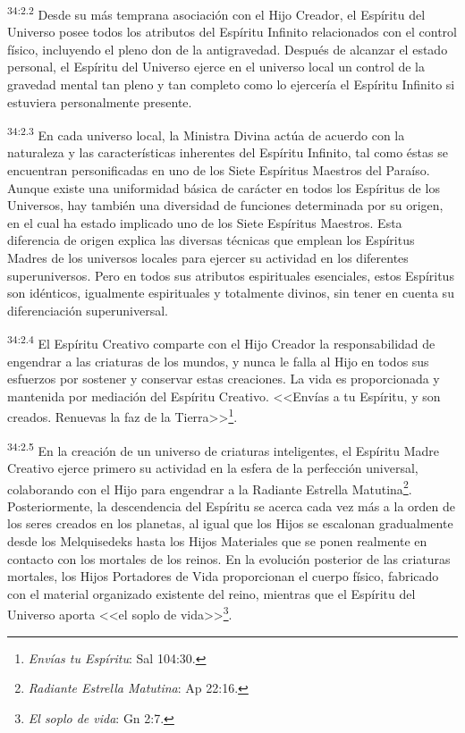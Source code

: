 \par
\textsuperscript{34:2.2} Desde su más temprana asociación con el Hijo Creador, el Espíritu del Universo posee todos los atributos del Espíritu Infinito relacionados con el control físico, incluyendo el pleno don de la antigravedad. Después de alcanzar el estado personal, el Espíritu del Universo ejerce en el universo local un control de la gravedad mental tan pleno y tan completo como lo ejercería el Espíritu Infinito si estuviera personalmente presente.

\par
\textsuperscript{34:2.3} En cada universo local, la Ministra Divina actúa de acuerdo con la naturaleza y las características inherentes del Espíritu Infinito, tal como éstas se encuentran personificadas en uno de los Siete Espíritus Maestros del Paraíso. Aunque existe una uniformidad básica de carácter en todos los Espíritus de los Universos, hay también una diversidad de funciones determinada por su origen, en el cual ha estado implicado uno de los Siete Espíritus Maestros. Esta diferencia de origen explica las diversas técnicas que emplean los Espíritus Madres de los universos locales para ejercer su actividad en los diferentes superuniversos. Pero en todos sus atributos espirituales esenciales, estos Espíritus son idénticos, igualmente espirituales y totalmente divinos, sin tener en cuenta su diferenciación superuniversal.

\par
\textsuperscript{34:2.4} El Espíritu Creativo comparte con el Hijo Creador la responsabilidad de engendrar a las criaturas de los mundos, y nunca le falla al Hijo en todos sus esfuerzos por sostener y conservar estas creaciones. La vida es proporcionada y mantenida por mediación del Espíritu Creativo. <<Envías a tu Espíritu, y son creados. Renuevas la faz de la Tierra>>\footnote{\textit{Envías tu Espíritu}: Sal 104:30.}.

\par
\textsuperscript{34:2.5} En la creación de un universo de criaturas inteligentes, el Espíritu Madre Creativo ejerce primero su actividad en la esfera de la perfección universal, colaborando con el Hijo para engendrar a la Radiante Estrella Matutina\footnote{\textit{Radiante Estrella Matutina}: Ap 22:16.}. Posteriormente, la descendencia del Espíritu se acerca cada vez más a la orden de los seres creados en los planetas, al igual que los Hijos se escalonan gradualmente desde los Melquisedeks hasta los Hijos Materiales que se ponen realmente en contacto con los mortales de los reinos. En la evolución posterior de las criaturas mortales, los Hijos Portadores de Vida proporcionan el cuerpo físico, fabricado con el material organizado existente del reino, mientras que el Espíritu del Universo aporta <<el soplo de vida>>\footnote{\textit{El soplo de vida}: Gn 2:7.}.

